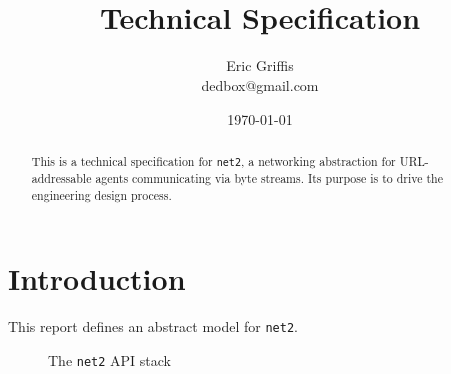 \documentclass[letterpaper,12pt,openany]{report}
\title{\NetTwo  \\ Technical Specification}
\author{Eric Griffis \\ dedbox@gmail.com}
\date{\today}
\newcommand{\NetTwo}{\texttt{net2}}
\begin{document}


\maketitle

\begin{abstract}
  This is a technical specification for {\NetTwo}, a networking abstraction
  for URL-addressable agents communicating via byte streams. Its purpose is to
  drive the engineering design process.
\end{abstract}

\tableofcontents

\listoffigures


\clearpage
{}
\setcounter{page}{1}
\pagestyle{plain}


\chapter{Introduction}
\label{cha:introduction}

This report defines an abstract model for {\NetTwo}.

\begin{figure}
  \centering
  

  \caption{The {\NetTwo} API stack}
  \label{fig:net2-api-stack}
\end{figure}
\end{document}
